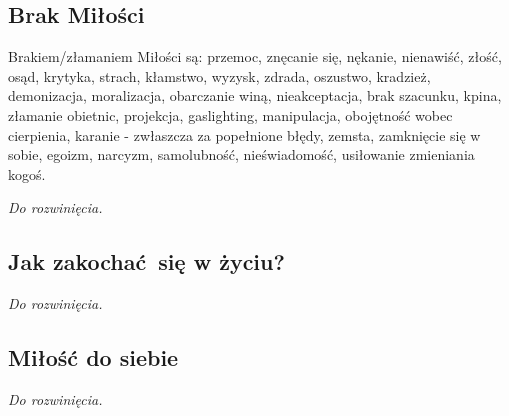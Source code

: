\documentclass[../dotknieci-miloscia.tex]{subfiles}
\begin{document}
\ornamentbreak

\vspace*{-1.5em}
\begin{multicols}{2}


\subsection{Brak Miłości}
\label{sztuka/milosc/brak-milosci}

Brakiem/złamaniem Miłości są:
przemoc, znęcanie się, nękanie, nienawiść, złość, osąd, krytyka,
strach, kłamstwo, wyzysk, zdrada, oszustwo, kradzież,
demonizacja, moralizacja, obarczanie winą, nieakceptacja, 
brak szacunku, kpina, złamanie obietnic, projekcja, gaslighting, manipulacja,
obojętność wobec cierpienia, karanie - zwłaszcza za popełnione błędy,
zemsta, zamknięcie się w sobie, egoizm, narcyzm, samolubność,
nieświadomość, usiłowanie zmieniania kogoś.

\emph{Do rozwinięcia.}

\columnbreak


\subsection{Jak zakochać się w życiu?}
\label{sztuka/milosc/jak-zakochac-sie-w-zyciu}
\emph{Do rozwinięcia.}


\subsection{Miłość do siebie}
\label{sztuka/milosc/milosc-do-siebie}
\emph{Do rozwinięcia.}


\end{multicols}
\end{document}
